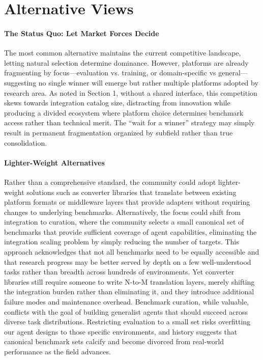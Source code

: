 \documentclass{article}
\theoremstyle{plain}
\theoremstyle{definition}
\theoremstyle{remark}
\begin{document}
\section{Alternative Views}

\paragraph{The Status Quo: Let Market Forces Decide}
The most common alternative maintains the current competitive landscape, letting natural selection determine dominance. However, platforms are already fragmenting by focus—evaluation vs. training, or domain-specific vs general—suggesting no single winner will emerge but rather multiple platforms adopted by research area. As noted in Section 1, without a shared interface, this competition skews towards integration catalog size, distracting from innovation while producing a divided ecosystem where platform choice determines benchmark access rather than technical merit. The ``wait for a winner'' strategy may simply result in permanent fragmentation organized by subfield rather than true consolidation.

\paragraph{Lighter-Weight Alternatives}
Rather than a comprehensive standard, the community could adopt lighter-weight solutions such as converter libraries that translate between existing platform formats or middleware layers that provide adapters without requiring changes to underlying benchmarks. Alternatively, the focus could shift from integration to curation, where the community selects a small canonical set of benchmarks that provide sufficient coverage of agent capabilities, eliminating the integration scaling problem by simply reducing the number of targets. This approach acknowledges that not all benchmarks need to be equally accessible and that research progress may be better served by depth on a few well-understood tasks rather than breadth across hundreds of environments. Yet converter libraries still require someone to write N-to-M translation layers, merely shifting the integration burden rather than eliminating it, and they introduce additional failure modes and maintenance overhead. Benchmark curation, while valuable, conflicts with the goal of building generalist agents that should succeed across diverse task distributions. Restricting evaluation to a small set risks overfitting our agent designs to those specific environments, and history suggests that canonical benchmark sets calcify and become divorced from real-world performance as the field advances.
\end{document}
